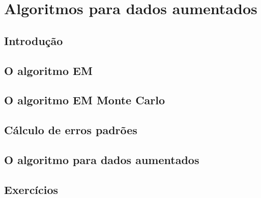 \documentclass[
]{latex/krantz}
\theoremstyle{definition}
\theoremstyle{definition}
\theoremstyle{definition}
\theoremstyle{definition}
\theoremstyle{remark}
\begin{document}
\hypertarget{algoritmos-para-dados-aumentados}{%
\chapter{Algoritmos para dados aumentados}\label{algoritmos-para-dados-aumentados}}

\hypertarget{introduuxe7uxe3o-15}{%
\section{Introdução}\label{introduuxe7uxe3o-15}}

\hypertarget{o-algoritmo-em}{%
\section{O algoritmo EM}\label{o-algoritmo-em}}

\hypertarget{o-algoritmo-em-monte-carlo}{%
\section{O algoritmo EM Monte Carlo}\label{o-algoritmo-em-monte-carlo}}

\hypertarget{cuxe1lculo-de-erros-padruxf5es}{%
\section{Cálculo de erros padrões}\label{cuxe1lculo-de-erros-padruxf5es}}

\hypertarget{o-algoritmo-para-dados-aumentados}{%
\section{O algoritmo para dados aumentados}\label{o-algoritmo-para-dados-aumentados}}

\hypertarget{exercuxedcios-15}{%
\section{Exercícios}\label{exercuxedcios-15}}

\backmatter

  

\printindex
\end{document}
